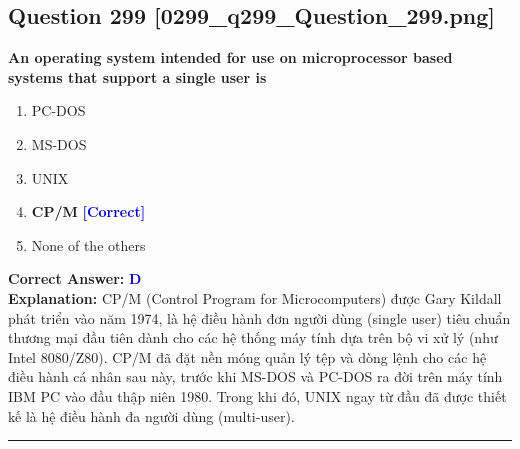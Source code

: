 \documentclass[11pt,a4paper]{article}
\begin{document}
\begin{minipage}{\textwidth}
\subsection*{Question 299 \quad \footnotesize{[0299\_q299\_Question\_299.png]}}
\noindent \textbf{An operating system intended for use on microprocessor based systems that support a single user is}

\begin{enumerate}[label=\Alph*.]
    \item PC-DOS
    \item MS-DOS
    \item UNIX
    \item \textbf{CP/M} \hfill \textcolor{blue}{\textbf{[Correct]}}
    \item None of the others
\end{enumerate}

\noindent \textbf{Correct Answer:} \textcolor{blue}{\textbf{D}} \\[2pt]
\noindent \textbf{Explanation:} CP/M (Control Program for Microcomputers) được Gary Kildall phát triển vào năm 1974, là hệ điều hành đơn người dùng (single user) tiêu chuẩn thương mại đầu tiên dành cho các hệ thống máy tính dựa trên bộ vi xử lý (như Intel 8080/Z80). CP/M đã đặt nền móng quản lý tệp và dòng lệnh cho các hệ điều hành cá nhân sau này, trước khi MS-DOS và PC-DOS ra đời trên máy tính IBM PC vào đầu thập niên 1980. Trong khi đó, UNIX ngay từ đầu đã được thiết kế là hệ điều hành đa người dùng (multi-user).

\par\vspace{0.3cm}
\hrule
\vspace{0.3cm}
\end{minipage}
\end{document}
